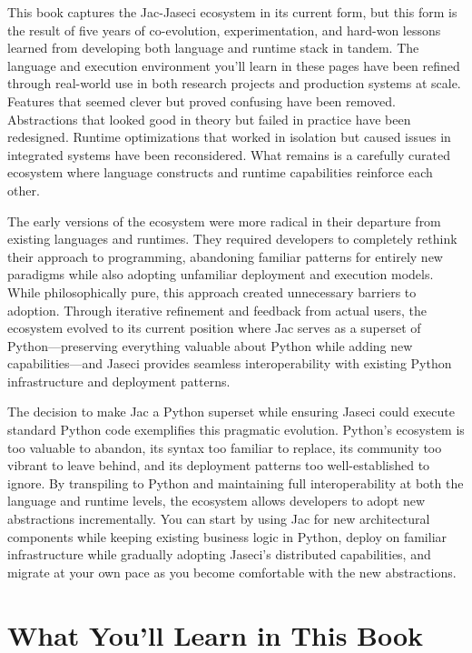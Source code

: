 This book captures the Jac-Jaseci ecosystem in its current form, but this form is the result of five years of co-evolution, experimentation, and hard-won lessons learned from developing both language and runtime stack in tandem. The language and execution environment you'll learn in these pages have been refined through real-world use in both research projects and production systems at scale. Features that seemed clever but proved confusing have been removed. Abstractions that looked good in theory but failed in practice have been redesigned. Runtime optimizations that worked in isolation but caused issues in integrated systems have been reconsidered. What remains is a carefully curated ecosystem where language constructs and runtime capabilities reinforce each other.

The early versions of the ecosystem were more radical in their departure from existing languages and runtimes. They required developers to completely rethink their approach to programming, abandoning familiar patterns for entirely new paradigms while also adopting unfamiliar deployment and execution models. While philosophically pure, this approach created unnecessary barriers to adoption. Through iterative refinement and feedback from actual users, the ecosystem evolved to its current position where Jac serves as a superset of Python—preserving everything valuable about Python while adding new capabilities—and Jaseci provides seamless interoperability with existing Python infrastructure and deployment patterns.

The decision to make Jac a Python superset while ensuring Jaseci could execute standard Python code exemplifies this pragmatic evolution. Python's ecosystem is too valuable to abandon, its syntax too familiar to replace, its community too vibrant to leave behind, and its deployment patterns too well-established to ignore. By transpiling to Python and maintaining full interoperability at both the language and runtime levels, the ecosystem allows developers to adopt new abstractions incrementally. You can start by using Jac for new architectural components while keeping existing business logic in Python, deploy on familiar infrastructure while gradually adopting Jaseci's distributed capabilities, and migrate at your own pace as you become comfortable with the new abstractions.

\section{What You'll Learn in This Book}

